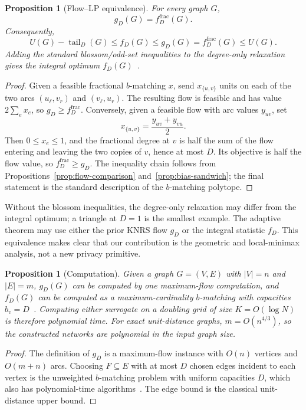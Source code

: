 \documentclass[11pt]{article}
\newtheorem{proposition}[theorem]{Proposition}
\newcommand{\tail}{\operatorname{tail}}
\begin{document}
\begin{proposition}[Flow--LP equivalence]
\label{prop:fractional}
For every graph \(G\),
\[
g_D(G)=f_D^{\mathrm{frac}}(G).
\]
Consequently,
\[
U(G)-\tail_D(G)\le f_D(G)\le g_D(G)=f_D^{\mathrm{frac}}(G)\le U(G).
\]
Adding the standard blossom/odd-set inequalities to the degree-only relaxation gives the integral optimum \(f_D(G)\)~\cite[Chapter 31]{Schrijver03}.
\end{proposition}

\begin{proof}
Given a feasible fractional \(b\)-matching \(x\), send \(x_{\{u,v\}}\) units on each of the two arcs \((u_\ell,v_r)\) and \((v_\ell,u_r)\). The resulting flow is feasible and has value \(2\sum_e x_e\), so \(g_D\ge f_D^{\mathrm{frac}}\). Conversely, given a feasible flow with arc values \(y_{uv}\), set
\[
x_{\{u,v\}}=\frac{y_{uv}+y_{vu}}{2}.
\]
Then \(0\le x_e\le1\), and the fractional degree at \(v\) is half the sum of the flow entering and leaving the two copies of \(v\), hence at most \(D\). Its objective is half the flow value, so \(f_D^{\mathrm{frac}}\ge g_D\). The inequality chain follows from Propositions~\ref{prop:flow-comparison} and~\ref{prop:bias-sandwich}; the final statement is the standard description of the \(b\)-matching polytope.
\end{proof}

Without the blossom inequalities, the degree-only relaxation may differ from the integral optimum; a triangle at \(D=1\) is the smallest example. The adaptive theorem may use either the prior KNRS flow \(g_D\) or the integral statistic \(f_D\). This equivalence makes clear that our contribution is the geometric and local-minimax analysis, not a new privacy primitive.

\begin{proposition}[Computation]
\label{prop:computation}
Given a graph \(G=(V,E)\) with \(|V|=n\) and \(|E|=m\), \(g_D(G)\) can be computed by one maximum-flow computation, and \(f_D(G)\) can be computed as a maximum-cardinality \(b\)-matching with capacities \(b_v=D\)~\cite{Schrijver03,Gabow18}. Computing either surrogate on a doubling grid of size \(K=O(\log N)\) is therefore polynomial time. For exact unit-distance graphs, \(m=O(n^{4/3})\), so the constructed networks are polynomial in the input graph size.
\end{proposition}

\begin{proof}
The definition of \(g_D\) is a maximum-flow instance with \(O(n)\) vertices and \(O(m+n)\) arcs. Choosing \(F\subseteq E\) with at most \(D\) chosen edges incident to each vertex is the unweighted \(b\)-matching problem with uniform capacities \(D\), which also has polynomial-time algorithms~\cite{Schrijver03,Gabow18}. The edge bound is the classical unit-distance upper bound.
\end{proof}
\end{document}
